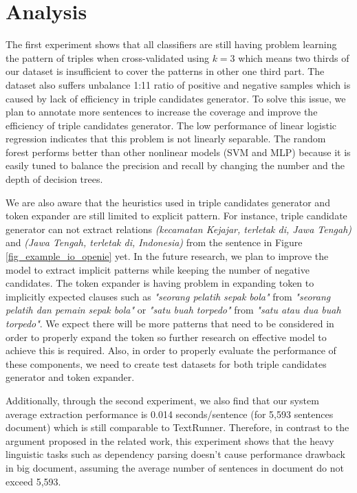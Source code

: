 \documentclass[conference,compsoc,12pt]{IEEEtran}
\begin{document}
\section{Analysis}

The first experiment shows that all classifiers are still having problem learning the pattern of triples when cross-validated using $k=3$ which means two thirds of our dataset is insufficient to cover the patterns in other one third part. The dataset also suffers unbalance 1:11 ratio of positive and negative samples which is caused by lack of efficiency in triple candidates generator. To solve this issue, we plan to annotate more sentences to increase the coverage and improve the efficiency of triple candidates generator. The low performance of linear logistic regression indicates that this problem is not linearly separable. The random forest performs better than other nonlinear models (SVM and MLP) because it is easily tuned to balance the precision and recall by changing the number and the depth of decision trees.

We are also aware that the heuristics used in triple candidates generator and token expander are still limited to explicit pattern. For instance, triple candidate generator can not extract relations \textit{(kecamatan Kejajar, terletak di, Jawa Tengah)} and \textit{(Jawa Tengah, terletak di, Indonesia)} from the sentence in Figure \ref{fig_example_io_openie} yet. In the future research, we plan to improve the model to extract implicit patterns while keeping the number of negative candidates. The token expander is having problem in expanding token to implicitly expected clauses such as \textit{"seorang pelatih sepak bola"} from \textit{"seorang pelatih dan pemain sepak bola"} or \textit{"satu buah torpedo"} from \textit{"satu atau dua buah torpedo"}. We expect there will be more patterns that need to be considered in order to properly expand the token so further research on effective model to achieve this is required. Also, in order to properly evaluate the performance of these components, we need to create test datasets for both triple candidates generator and token expander.

Additionally, through the second experiment, we also find that our system average extraction performance is 0.014 seconds/sentence (for 5,593 sentences document) which is still comparable to TextRunner\cite{banko2007open}. Therefore, in contrast to the argument proposed in the related work\cite{banko2007open}\cite{etzioni2011open}, this experiment shows that the heavy linguistic tasks such as dependency parsing doesn't cause performance drawback in big document, assuming the average number of sentences in document do not exceed 5,593.
\end{document}
